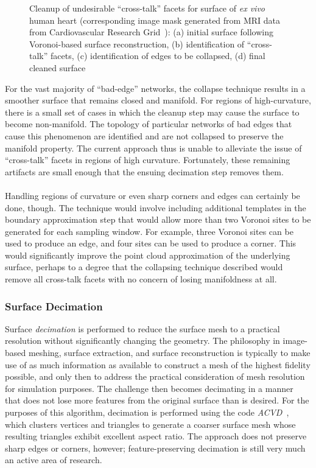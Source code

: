 \begin{figure}[htbp!]
{\label{fig:cross2-4}}		
%
\caption{Cleanup of undesirable ``cross-talk'' facets for surface of \textit{ex vivo} human heart (corresponding image mask generated from MRI data from Cardiovascular Research Grid~\cite{cvgg}): (a) initial surface following Voronoi-based surface reconstruction, (b) identification of ``cross-talk'' facets, (c) identification of edges to be collapsed, (d) final cleaned surface}
\label{fig:cross2}
\end{figure}
\noindent For the vast majority of ``bad-edge'' networks, the collapse technique results in a smoother surface that remains closed and manifold. For regions of high-curvature, there is a small set of cases in which the cleanup step may cause the surface to become non-manifold. The topology of particular networks of bad edges that cause this phenomenon are identified and are not collapsed to preserve the manifold property. The current approach thus is unable to alleviate the issue of ``cross-talk'' facets in regions of high curvature. Fortunately, these remaining artifacts are small enough that the ensuing decimation step removes them. \\ \\
%
Handling regions of curvature or even sharp corners and edges can certainly be done, though. The technique would involve including additional templates in the boundary approximation step that would allow more than two Voronoi sites to be generated for each sampling window. For example, three Voronoi sites can be used to produce an edge, and four sites can be used to produce a corner. This would significantly improve the point cloud approximation of the underlying surface, perhaps to a degree that the collapsing technique described would remove all cross-talk facets with no concern of losing manifoldness at all.

\subsubsection{Surface Decimation}

Surface \textit{decimation} is performed to reduce the surface mesh to a practical resolution without significantly changing the geometry. The philosophy in image-based meshing, surface extraction, and surface reconstruction is typically to make use of as much information as available to construct a mesh of the highest fidelity possible, and only then to address the practical consideration of mesh resolution for simulation purposes. The challenge then becomes decimating in a manner that does not lose more features from the original surface than is desired. For the purposes of this algorithm, decimation is performed using the code \textit{ACVD}~\cite{valette_2004, valette_2008}, which clusters vertices and triangles to generate a coarser surface mesh whose resulting triangles exhibit excellent aspect ratio. The approach does not preserve sharp edges or corners, however; feature-preserving decimation is still very much an active area of research.

